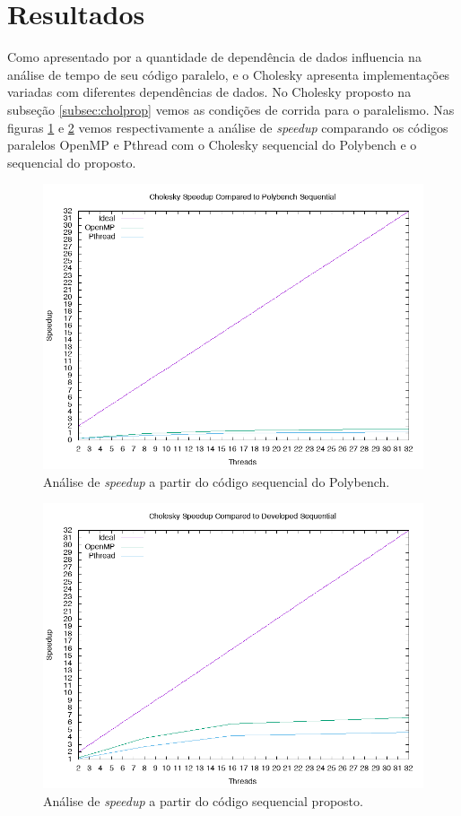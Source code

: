 \documentclass[12pt]{article}
\newcommand\tab[1][1cm]{\hspace*{#1}}
\begin{document}
\section{Resultados}\label{sec:res}

\tab Como apresentado por \cite{ruschel:16} a quantidade de dependência de dados influencia na análise de tempo de seu código paralelo, e o Cholesky apresenta implementações variadas com diferentes dependências de dados.  No Cholesky proposto na subseção \ref{subsec:cholprop} vemos as condições de corrida para o paralelismo. Nas figuras \ref{fig:polybench_speedup} e \ref{fig:developed_speedup} vemos respectivamente a análise de \textit{speedup} comparando os códigos paralelos OpenMP e Pthread com o Cholesky sequencial do Polybench e o sequencial do proposto.

\begin{figure}[ht]
\centering
\includegraphics[width=.5\textwidth]{polybench.png}
\caption{Análise de \textit{speedup} a partir do código sequencial do Polybench.}
\label{fig:polybench_speedup}
\end{figure}

\begin{figure}[ht]
\centering
\includegraphics[width=.5\textwidth]{developed.png}
\caption{Análise de \textit{speedup} a partir do código sequencial proposto.}
\label{fig:developed_speedup}
\end{figure}
\end{document}
